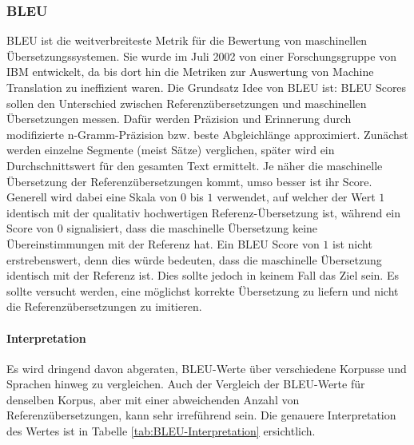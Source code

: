 \subsubsection{\gls{BLEU}}
\label{sub:BLEU}
\gls{BLEU} ist die weitverbreiteste Metrik für die Bewertung von maschinellen Übersetzungssystemen. Sie wurde im Juli
2002 von einer Forschungsgruppe von IBM entwickelt, da bis dort hin die Metriken zur Auswertung von Machine Translation
zu ineffizient waren. Die Grundsatz Idee von \gls{BLEU} ist: \gls{BLEU} Scores sollen den Unterschied zwischen
Referenzübersetzungen und maschinellen Übersetzungen messen. Dafür werden Präzision und Erinnerung durch modifizierte
n-Gramm-Präzision bzw. beste Abgleichlänge approximiert. 
\newline
\newline
Zunächst werden einzelne Segmente (meist Sätze) verglichen, später wird ein Durchschnittswert für den gesamten Text
ermittelt. Je näher die maschinelle Übersetzung der Referenzübersetzungen kommt, umso besser ist ihr Score. Generell wird
dabei eine Skala von $0$ bis $1$ verwendet, auf welcher der Wert $1$ identisch mit der qualitativ hochwertigen
Referenz-Übersetzung ist, während ein Score von $0$ signalisiert, dass die maschinelle Übersetzung keine
Übereinstimmungen mit der Referenz hat.
\newline
\newline
Ein \gls{BLEU} Score von $1$ ist nicht erstrebenswert, denn dies würde bedeuten, dass die maschinelle Übersetzung
identisch mit der Referenz ist. Dies sollte jedoch in keinem Fall das Ziel sein. Es sollte versucht werden, eine
möglichst korrekte Übersetzung zu liefern und nicht die Referenzübersetzungen zu imitieren.

\paragraph{Interpretation} Es wird dringend davon abgeraten, BLEU-Werte über verschiedene Korpusse und Sprachen hinweg
zu vergleichen. Auch der Vergleich der BLEU-Werte für denselben Korpus, aber mit einer abweichenden Anzahl von
Referenzübersetzungen, kann sehr irreführend sein. Die genauere Interpretation des Wertes ist in Tabelle
\ref{tab:BLEU-Interpretation} ersichtlich.

